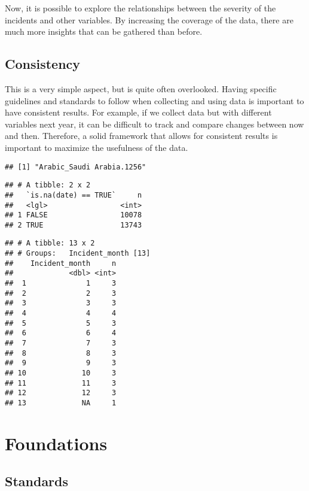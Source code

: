 \documentclass[
]{book}
\begin{document}
Now, it is possible to explore the relationships between the severity of the incidents and other variables. By increasing the coverage of the data, there are much more insights that can be gathered than before.

\hypertarget{consistency}{%
\section{Consistency}\label{consistency}}

This is a very simple aspect, but is quite often overlooked. Having specific guidelines and standards to follow when collecting and using data is important to have consistent results. For example, if we collect data but with different variables next year, it can be difficult to track and compare changes between now and then. Therefore, a solid framework that allows for consistent results is important to maximize the usefulness of the data.

\begin{verbatim}
## [1] "Arabic_Saudi Arabia.1256"
\end{verbatim}

\begin{verbatim}
## # A tibble: 2 x 2
##   `is.na(date) == TRUE`     n
##   <lgl>                 <int>
## 1 FALSE                 10078
## 2 TRUE                  13743
\end{verbatim}

\begin{verbatim}
## # A tibble: 13 x 2
## # Groups:   Incident_month [13]
##    Incident_month     n
##             <dbl> <int>
##  1              1     3
##  2              2     3
##  3              3     3
##  4              4     4
##  5              5     3
##  6              6     4
##  7              7     3
##  8              8     3
##  9              9     3
## 10             10     3
## 11             11     3
## 12             12     3
## 13             NA     1
\end{verbatim}

\hypertarget{foundations}{%
\chapter{Foundations}\label{foundations}}

\hypertarget{standards}{%
\section{Standards}\label{standards}}
\end{document}
